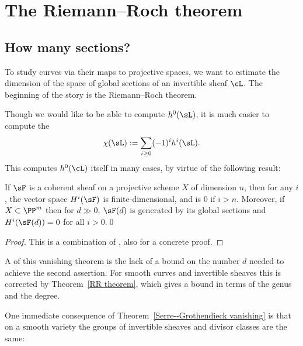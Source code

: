 

\chapter{The Riemann--Roch theorem}\label{RiemannRochChapter}

\section{How many sections?}

To study curves via their maps to projective spaces, we want to estimate the dimension of the space of global
sections of an invertible sheaf $\cL$. The beginning
of the story is the Riemann--Roch theorem.

Though we would like to be able to compute $h^0(\sL)$, it is much
easier to compute the 
%
$$
\chi(\sL):= \sum_{i\geq 0} (-1)^i h^i(\sL).
$$
This computes $h^0(\cL)$ itself in many cases, by virtue of the following result:

\begin{theorem}
\label{Serre--Grothendieck vanishing}
%
%
If $\sF$ is a coherent sheaf on a projective scheme $X$ of dimension $n$, then for any $i$, the vector space $H^i(\sF)$ is finite-dimensional, and is 0 if  $i> n$. Moreover,
if $X\subset \PP^m$ then for $d\gg 0$, $\sF(d)$ is generated by its global sections and $H^i(\sF(d)) = 0$ for all $i>0$.\qed
\end{theorem}

\begin{proof}
This is a combination of 
\cite[Theorems III.2.7 and III.5.2]{Hartshorne1977}, 
also \cite{Serre1955} for a 
concrete proof.
\end{proof}

A 
of this vanishing theorem is the lack of a bound on the number $d$ needed to achieve the second assertion. For smooth curves
and invertible sheaves
this is corrected by Theorem~\ref{RR theorem}, which gives a bound in terms of the genus and the degree.

One immediate consequence of Theorem~\ref{Serre--Grothendieck vanishing} is that on a smooth variety the groups of invertible sheaves and divisor classes are the same:

